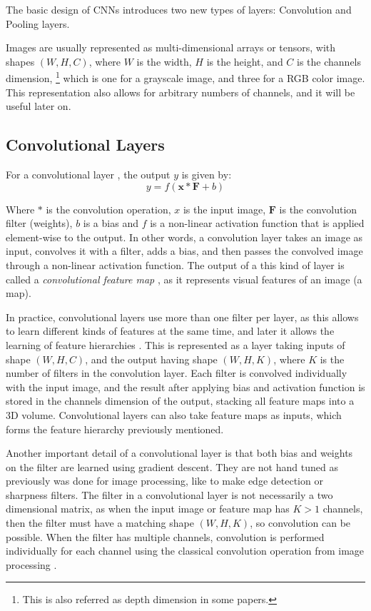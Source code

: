 The basic design of CNNs introduces two new types of layers: Convolution and Pooling layers.

Images are usually represented as multi-dimensional arrays or tensors,  with shapes $(W, H, C)$, where $W$ is the width, $H$ is the height, and $C$ is the channels dimension, \footnote{This is also referred as depth dimension in some papers.} which is one for a grayscale image, and three for a RGB color image. This representation also allows for arbitrary numbers of channels, and it will be useful later on.

\subsection{Convolutional Layers}

For a convolutional layer , the output $y$ is given by:
\vspace*{1em}
\begin{equation}
    y = f(\mathbf{x} \ast \mathbf{F} + b)
\end{equation}

Where $\ast$ is the convolution operation, $x$ is the input image, $\mathbf{F}$ is the convolution filter (weights), $b$ is a bias and $f$ is a non-linear activation function that is applied element-wise to the output. In other words, a convolution layer takes an image as input, convolves it with a filter, adds a bias, and then passes the convolved image through a non-linear activation function. The output of a this kind of layer is called a \textit{convolutional feature map} , as it represents visual features of an image (a map).

In practice, convolutional layers use more than one filter per layer, as this allows to learn different kinds of features at the same time, and later it allows the learning of feature hierarchies \cite{zeiler2014visualizing}. This is represented as a layer taking inputs of shape $(W, H, C)$, and the output having shape $(W, H, K)$, where $K$ is the number of filters in the convolution layer. Each filter is convolved individually with the input image, and the result after applying bias and activation function is stored in the channels dimension of the output, stacking all feature maps into a 3D volume. Convolutional layers can also take feature maps as inputs, which forms the feature hierarchy previously mentioned.

Another important detail of a convolutional layer is that both bias and weights on the filter are learned using gradient descent. They are not hand tuned as previously was done for image processing, like to make edge detection or sharpness filters. The filter in a convolutional layer is not necessarily a two dimensional matrix, as when the input image or feature map has $K > 1$ channels, then the filter must have a matching shape $(W, H, K)$, so convolution can be possible. When the filter has multiple channels, convolution is performed individually for each channel using the classical convolution operation from image processing \cite[-1em]{gonzalezDIP2006}.

